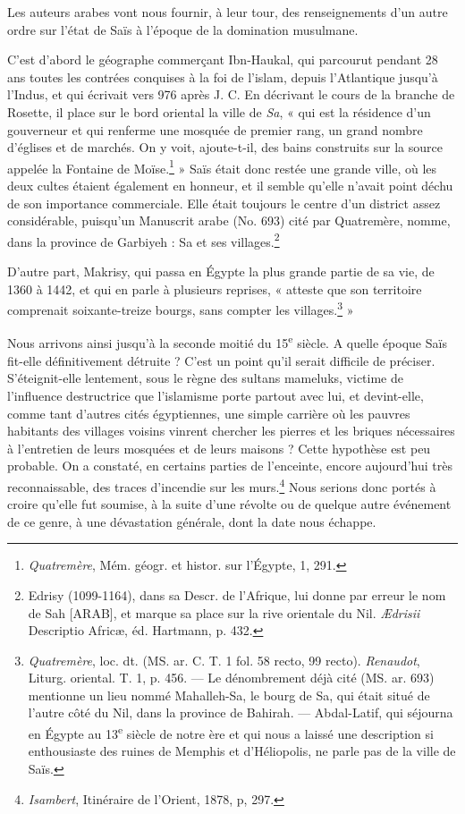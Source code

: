 \documentclass[a4paper, 11pt, oneside]{article}
\begin{document}
Les auteurs arabes vont nous fournir, à leur tour, des renseignements d'un autre ordre sur l'état de Saïs à l'époque de la domination musulmane.

C'est d'abord le géographe commerçant Ibn-Haukal, qui parcourut pendant 28 ans toutes les contrées conquises à la foi de l'islam, depuis l'Atlantique jusqu'à l'Indus, et qui écrivait vers 976 après J. C. En décrivant le cours de la branche de Rosette, il place sur le bord oriental la ville de \emph{Sa}, « qui est la résidence d'un gouverneur et qui renferme une mosquée de premier rang, un grand nombre d'églises et de marchés. On y voit, ajoute-t-il, des bains construits sur la source appelée la Fontaine de Moïse.\footnote{\emph{Quatremère}, Mém. géogr. et histor. sur l'Égypte, 1, 291.} » Saïs était donc restée une grande ville, où les deux cultes étaient également en honneur, et il semble qu'elle n'avait point déchu de son importance commerciale. Elle était toujours le centre d'un district assez considérable, puisqu'un Manuscrit arabe (No. 693) cité par Quatremère, nomme, dans la province de Garbiyeh : Sa et ses villages.\footnote{Edrisy (1099-1164), dans sa Descr. de l'Afrique, lui donne par erreur le nom de Sah [ARAB], et marque sa place sur la rive orientale du Nil. \emph{Ædrisii} Descriptio Africæ, éd. Hartmann, p. 432.}

D'autre part, Makrisy, qui passa en Égypte la plus grande partie de sa vie, de 1360 à 1442, et qui en parle à plusieurs reprises, « atteste que son territoire comprenait soixante-treize bourgs, sans compter les villages.\footnote{\emph{Quatremère}, loc. dt. (MS. ar. C. T. 1 fol. 58 recto, 99 recto). \emph{Renaudot}, Liturg. oriental. T. 1, p. 456. --- Le dénombrement déjà cité (MS. ar. 693) mentionne un lieu nommé Mahalleh-Sa, le bourg de Sa, qui était situé de l'autre côté du Nil, dans la province de Bahirah. --- Abdal-Latif, qui séjourna en Égypte au 13\textsuperscript{e} siècle de notre ère et qui nous a laissé une description si enthousiaste des ruines de Memphis et d'Héliopolis, ne parle pas de la ville de Saïs.} »

Nous arrivons ainsi jusqu'à la seconde moitié du 15\textsuperscript{e} siècle. A quelle époque Saïs fit-elle définitivement détruite ? C'est un point qu'il serait difficile de préciser. S'éteignit-elle lentement, sous le règne des sultans mameluks, victime de l'influence destructrice que l'islamisme porte partout avec lui, et devint-elle, comme tant d'autres cités égyptiennes, une simple carrière où les pauvres habitants des villages voisins vinrent chercher les pierres et les briques nécessaires à l'entretien de leurs mosquées et de leurs maisons ? Cette hypothèse est peu probable. On a constaté, en certains parties de l'enceinte, encore aujourd'hui très reconnaissable, des traces d'incendie sur les murs.\footnote{\emph{Isambert}, Itinéraire de l'Orient, 1878, p, 297.} Nous serions donc portés à croire qu'elle fut soumise, à la suite d'une révolte ou de quelque autre événement de ce genre, à une dévastation générale, dont la date nous échappe.
\end{document}
